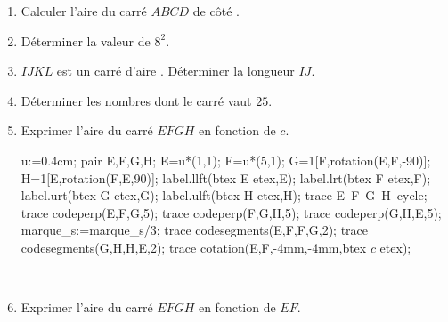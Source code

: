 \begin{activite}    
    \begin{spacing}{1.5}
        \begin{enumerate}
            \item Calculer l'aire du carré $ABCD$ de côté .\smallskip\\\makebox[\linewidth]{\dotfill}
            \item Déterminer la valeur de $8^2$.\smallskip\\\makebox[\linewidth]{\dotfill}
            \item $IJKL$ est un carré d'aire . Déterminer la longueur $IJ$.\smallskip\\\makebox[\linewidth]{\dotfill}
            \item Déterminer les nombres dont le carré vaut $25$.\smallskip\\\makebox[\linewidth]{\dotfill}
            \item Exprimer l'aire du carré $EFGH$ en fonction de $c$.
            
            \begin{Geometrie}[CoinBG={(-u,-u)},CoinHD={(6u,6u)}]
                u:=0.4cm;
                pair E,F,G,H;
                E=u*(1,1);
                F=u*(5,1);
                G=1[F,rotation(E,F,-90)];
                H=1[E,rotation(F,E,90)];
                label.llft(btex E etex,E);
                label.lrt(btex  F etex,F);
                label.urt(btex  G etex,G);
                label.ulft(btex H etex,H);
                trace E--F--G--H--cycle;
                trace codeperp(E,F,G,5);
                trace codeperp(F,G,H,5);
                trace codeperp(G,H,E,5);
                marque_s:=marque_s/3;
                trace codesegments(E,F,F,G,2);
                trace codesegments(G,H,H,E,2);
                trace cotation(E,F,-4mm,-4mm,btex $c$ etex);
            \end{Geometrie}
            \smallskip\\\makebox[\linewidth]{\dotfill}
            \item Exprimer l'aire du carré $EFGH$ en fonction de $EF$.
            

\end{enumerate}
\end{spacing}
\end{activite}
